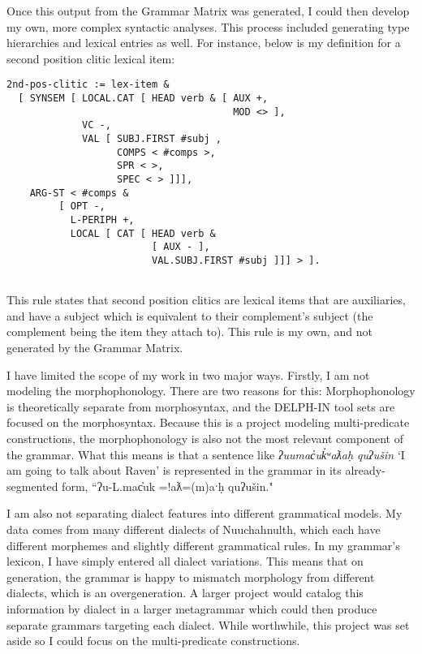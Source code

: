 Once this output from the Grammar Matrix was generated, I could then develop my own, more complex syntactic analyses. This process included generating type hierarchies and lexical entries as well. For instance, below is my definition for a second position clitic lexical item:


\begin{verbatim}
2nd-pos-clitic := lex-item &
  [ SYNSEM [ LOCAL.CAT [ HEAD verb & [ AUX +,
				                       MOD <> ],
             VC -,
             VAL [ SUBJ.FIRST #subj ,
                   COMPS < #comps >,
                   SPR < >,
                   SPEC < > ]]],
    ARG-ST < #comps &
         [ OPT -,
           L-PERIPH +,
           LOCAL [ CAT [ HEAD verb &
                         [ AUX - ],
                         VAL.SUBJ.FIRST #subj ]]] > ].
	
\end{verbatim}

\noindent This rule states that second position clitics are lexical items that are auxiliaries, and have a subject which is equivalent to their complement's subject (the complement being the item they attach to). This rule is my own, and not generated by the Grammar Matrix.


I have limited the scope of my work in two major ways. Firstly, I am not modeling the morphophonology. There are two reasons for this: Morphophonology is theoretically separate from morphosyntax, and the DELPH-IN tool sets are focused on the morphosyntax. Because this is a project modeling multi-predicate constructions, the morphophonology is also not the most relevant component of the grammar. What this means is that a sentence like \textit{ʔuumac̓uk̓ʷaƛaḥ quʔušin} `I am going to talk about Raven' is represented in the grammar in its already-segmented form, ``ʔu-L.mac̓uk =!aƛ=(m)aˑḥ quʔušin."

I am also not separating dialect features into different grammatical models. My data comes from many different dialects of Nuuchahnulth, which each have different morphemes and slightly different grammatical rules. In my grammar's lexicon, I have simply entered all dialect variations. This means that on generation, the grammar is happy to mismatch morphology from different dialects, which is an overgeneration. A larger project would catalog this information by dialect in a larger metagrammar which could then produce separate grammars targeting each dialect. While worthwhile, this project was set aside so I could focus on the multi-predicate constructions.

